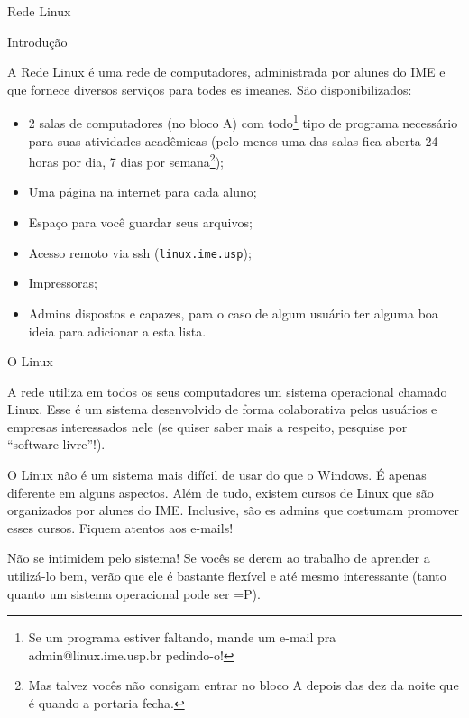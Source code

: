 \begin{subsecao}{Rede Linux}


\begin{subsubsecao}{Introdução}

A Rede Linux é uma rede de computadores, administrada por alunes do IME e
que fornece diversos serviços para todes es imeanes.
São disponibilizados:

\vspace{-1em}

\begin{itemize}
\item 2 salas de computadores (no bloco A) com todo\footnote{ Se um programa
estiver faltando, mande um e-mail pra admin@linux.ime.usp.br pedindo-o!} tipo de
programa necessário para suas atividades acadêmicas (pelo menos uma das salas fica
aberta 24 horas por dia, 7 dias por semana\footnote{ Mas talvez vocês não
consigam entrar no bloco A depois das dez da noite que é quando a portaria
fecha.});
\item Uma página na internet para cada aluno;
\item Espaço para você guardar seus arquivos;
\item Acesso remoto via ssh (\texttt{linux.ime.usp});
\item Impressoras;
\item Admins dispostos e capazes, para o caso de algum usuário ter alguma boa
ideia para adicionar a esta lista.
\end{itemize}
\end{subsubsecao}

\begin{subsubsecao}{O Linux}

A rede utiliza em todos os seus computadores um sistema operacional chamado
Linux. Esse é um sistema desenvolvido de forma colaborativa pelos usuários
e empresas interessados nele (se quiser saber mais a respeito, pesquise
por ``software livre''!).

O Linux não é um sistema mais difícil de usar do que o Windows. É apenas
diferente em alguns aspectos. Além de tudo, existem cursos de Linux que são
organizados por alunes do IME. Inclusive, são es admins que costumam promover 
esses cursos. Fiquem atentos aos e-mails!

Não se intimidem pelo sistema! Se vocês se derem ao trabalho de
aprender a utilizá-lo bem, verão que ele é bastante flexível e até mesmo
interessante (tanto quanto um sistema operacional pode ser =P).


\end{subsubsecao}
\end{subsecao}
